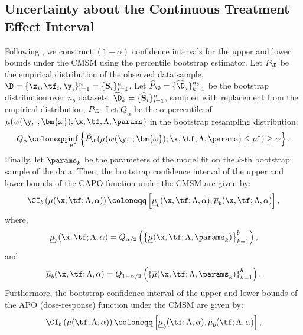 \subsection{Uncertainty about the Continuous Treatment Effect Interval}
\label{sec:uncertainty}
Following \cite{zhao2019sensitivity, dorn2021sharp, chernozhukov2021omitted}, we construct $(1 - \alpha)$ confidence intervals for the upper and lower bounds under the CMSM using the percentile bootstrap estimator.
Let $P_{\D}$ be the empirical distribution of the observed data sample, $\D=\{\x_i, \tf_i, \y_i\}_{i=1}^n = \{\mathbf{S}_i\}_{i=1}^n$.
Let $\widehat{P}_{\D} = \{\widehat{\D}_j\}_{k=1}^{n_b}$ be the bootstrap distribution over $n_b$ datasets, $\widehat{\D}_k=\{\widehat{\mathbf{S}}_i\}_{i=1}^n$, sampled with replacement from the empirical distribution, $P_{\D}$.
Let $Q_{\alpha}$ be the $\alpha$-percentile of $\mu(w(\y, \cdot; \bm{\omega}); \x, \tf, \Lambda, \params)$ in the bootstrap resampling distribution: 
\[Q_{\alpha} \coloneqq \inf_{\mu^*} \left\{\widehat{P}_\D(\mu(w(\y, \cdot; \bm{\omega}); \x, \tf, \Lambda, \params) \leq \mu^*) \geq \alpha \right\}.\]
Finally, let $\params_k$ be the parameters of the model fit on the $k$-th bootstrap sample of the data.
Then, the bootstrap confidence interval of the upper and lower bounds of the CAPO function under the CMSM are given by:
\begin{equation}
    \label{eq:capo_ci}
    \CI_b\left(\mu(\x, \tf; \Lambda, \alpha) \right) \coloneqq \left[ \underline{\mu}_{b}(\x, \tf; \Lambda, \alpha), \overline{\mu}_{b}(\x, \tf; \Lambda, \alpha) \right],
\end{equation}
where,
\begin{equation*}
    \underline{\mu}_{b}(\x, \tf; \Lambda, \alpha) = Q_{\alpha / 2} \left( \left\{ \underline{\mu}(\x, \tf; \Lambda, \params_k)  \right\}_{k = 1}^b \right),
\end{equation*}
and
\begin{equation*}
    \overline{\mu}_{b}(\x, \tf; \Lambda, \alpha) =  Q_{1 - \alpha / 2} \left( \left\{ \overline{\mu}(\x, \tf; \Lambda, \params_k)  \right\}_{k = 1}^b \right).
\end{equation*}
Furthermore, the bootstrap confidence interval of the upper and lower bounds of the APO (dose-response) function under the CMSM are given by:
\begin{equation}
    \label{eq:apo_ci}
    \CI_b\left(\mu(\tf; \Lambda, \alpha) \right) \coloneqq \left[ \underline{\mu}_{b}(\tf; \Lambda, \alpha), \overline{\mu}_{b}(\tf; \Lambda, \alpha) \right],
\end{equation}
